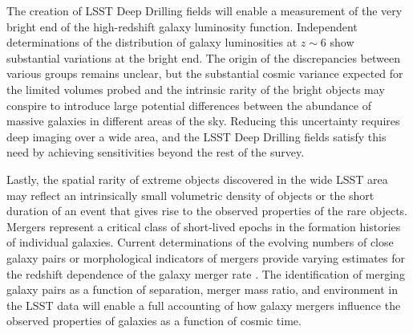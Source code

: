 The creation of LSST Deep Drilling fields will
enable a measurement of the very bright end
of the high-redshift galaxy luminosity function.
Independent determinations of the distribution of 
galaxy luminosities at $z\sim6$ show substantial
variations at the bright end. The origin of
the discrepancies between various groups remains
unclear, but the substantial cosmic variance expected
for the limited volumes probed and the intrinsic
rarity of the bright objects may conspire to
introduce large potential differences between
the abundance of massive galaxies in different
areas of the sky. Reducing this uncertainty requires
deep imaging over a wide area, and the LSST Deep Drilling
fields satisfy this need by achieving sensitivities
beyond the rest of the survey. 

Lastly, the spatial rarity of extreme objects discovered
in the wide LSST area may reflect an intrinsically
small volumetric density of objects or the short duration
of an event that gives rise to the observed properties of the
rare objects. Mergers represent a critical class 
of short-lived epochs in the formation histories of
individual galaxies. Current determinations of the evolving numbers
of close galaxy pairs or morphological indicators of
mergers provide varying estimates for the
redshift dependence of the galaxy merger rate 
\citep[e.g.,][]{conselice2003a,kartaltepe2007a,lotz2008a,lin2008a,robotham2014a}.
The identification of merging
galaxy pairs as a function of separation, merger
mass ratio, and environment in the LSST data will enable
a full accounting of how galaxy mergers influence
the observed properties of galaxies as a function of
cosmic time. 



